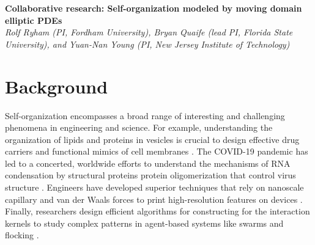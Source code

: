 \noindent
{\bf Collaborative research: Self-organization modeled by moving domain
elliptic PDEs} \\
{\em Rolf Ryham (PI, Fordham University),
Bryan Quaife (lead PI, Florida State University), and
Yuan-Nan Young (PI, New Jersey Institute of Technology)}

\section{Background}
\label{sec:background}

Self-organization encompasses a broad range of
interesting and challenging phenomena in engineering and science.
For example, understanding the
organization of lipids and proteins in vesicles is crucial to design
effective drug carriers
and functional mimics of cell membranes
\cite{Marui2022IncreasedEO,https://doi.org/10.1002/adma.202206288}.
The COVID-19 pandemic has led to a
concerted, worldwide efforts to understand
the mechanisms of RNA condensation by structural proteins protein
oligomerization that control virus structure
\cite{Kim2021SelfassembledMV}.
Engineers have developed superior techniques
that rely on nanoscale  
capillary and van der Waals forces
to print high-resolution
features on devices \cite{Zeng20223DprintedMT}.
Finally, researchers design efficient algorithms for
constructing for the interaction kernels to study complex
patterns in agent-based systems like swarms and flocking
\cite{Lu2019NonparametricIO,Tadmor2021OnTM}.


